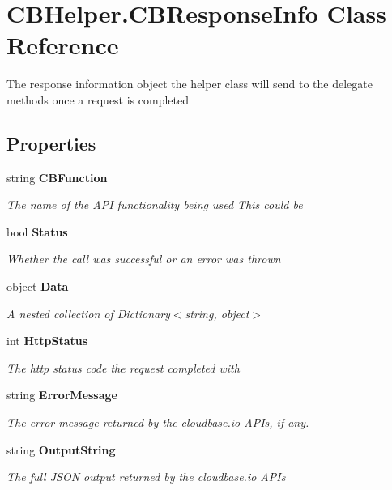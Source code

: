 \section{C\-B\-Helper.\-C\-B\-Response\-Info Class Reference}
\label{class_c_b_helper_1_1_c_b_response_info}


The response information object the helper class will send to the delegate methods once a request is completed  


\subsection*{Properties}
\begin{DoxyCompactItemize}
\item 
string {\bf C\-B\-Function}\hspace{0.3cm}{\ttfamily  [get, set]}
\begin{DoxyCompactList}\small\item\em The name of the A\-P\-I functionality being used This could be \end{DoxyCompactList}\item 
bool {\bf Status}\hspace{0.3cm}{\ttfamily  [get, set]}
\begin{DoxyCompactList}\small\item\em Whether the call was successful or an error was thrown \end{DoxyCompactList}\item 
object {\bf Data}\hspace{0.3cm}{\ttfamily  [get, set]}
\begin{DoxyCompactList}\small\item\em A nested collection of Dictionary$<$string, object$>$ \end{DoxyCompactList}\item 
int {\bf Http\-Status}\hspace{0.3cm}{\ttfamily  [get, set]}
\begin{DoxyCompactList}\small\item\em The http status code the request completed with \end{DoxyCompactList}\item 
string {\bf Error\-Message}\hspace{0.3cm}{\ttfamily  [get, set]}
\begin{DoxyCompactList}\small\item\em The error message returned by the cloudbase.\-io A\-P\-Is, if any. \end{DoxyCompactList}\item 
string {\bf Output\-String}\hspace{0.3cm}{\ttfamily  [get, set]}
\begin{DoxyCompactList}\small\item\em The full J\-S\-O\-N output returned by the cloudbase.\-io A\-P\-Is \end{DoxyCompactList}\end{DoxyCompactItemize}


